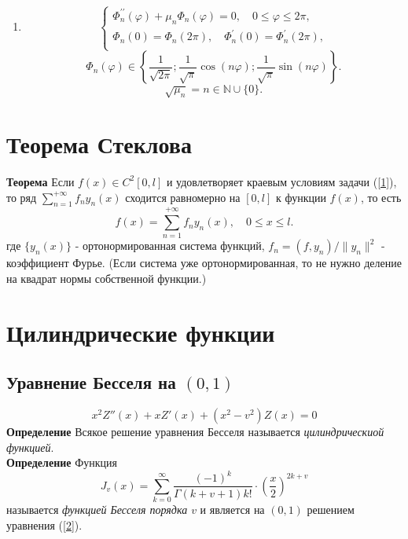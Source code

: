 \documentclass{article}
\begin{document}
\begin{enumerate}
	\item \begin{equation}
	\left\{\begin{array}{cc}
	\Phi_n^{\prime \prime}(\varphi)+\mu_n\Phi_n(\varphi)=0,\quad 0\le \varphi\le 2\pi,\\
	\Phi_n(0)=\Phi_n(2\pi),\quad \Phi_n^{\prime}(0)=\Phi_n^{\prime}(2\pi),\\
	\end{array}\right.
	\end{equation}
	\begin{equation}
	\Phi_n(\varphi)\in\left\{ \frac{1}{\sqrt{2\pi}};\frac{1}{\sqrt{\pi}}\cos(n\varphi);\frac{1}{\sqrt{\pi}}\sin(n\varphi)\right\}.
	\end{equation}
	\begin{equation}
	\sqrt{\mu_n}=n\in\mathbb{N}\cup\{0\}.
	\end{equation}
\end{enumerate}
\section{Теорема Стеклова}
\textbf{Теорема} Если $f(x)\in C^2[0,l]$ и удовлетворяет краевым условиям задачи (\ref{1}), то ряд $\sum_{n=1}^{+\infty} f_ny_n(x)$ сходится равномерно на $[0,l]$ к функции $f(x)$, то есть
\begin{equation}
f(x)=\sum_{n=1}^{+\infty} f_ny_n(x),\quad 0\le x\le l.
\end{equation}
где $\{y_n(x)\}$ - ортонормированная система функций, $f_n=(f,y_n)/\|y_n\|^2$ - коэффициент Фурье. (Если система уже ортонормированная, то не нужно деление на квадрат нормы собственной функции.)
\section{Цилиндрические функции}
\subsection{Уравнение Бесселя на $(0,1)$}
\begin{equation}
x^2Z''(x)+xZ'(x)+(x^2-v^2)Z(x)=0
\label{2}
\end{equation}
\textbf{Определение} Всякое решение уравнения Бесселя называется \emph{цилиндрическиой функцией}.\\

\noindent\textbf{Определение} Функция
\begin{equation}
J_v(x)=\sum_{k=0}^{\infty} \frac{(-1)^k}{\Gamma(k+v+1)k!}\cdot \left(\frac{x}{2}\right)^{2k+v}
\end{equation}
называется \emph{функцией Бесселя порядка $v$} и является на $(0,1)$ решением уравнения (\ref{2}).\\
\end{document}
